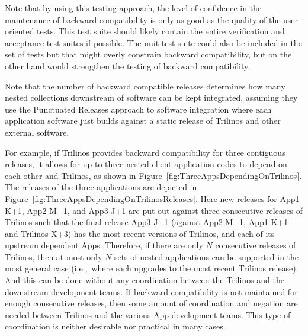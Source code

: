 \documentclass[11pt]{SANDreport}
\begin{document}
Note that by using this testing approach, the level of confidence in
the maintenance of backward compatibility is only as good as the quality
of the user-oriented tests.  This test suite
should likely contain the entire verification and acceptance test
suites if possible.  The unit test suite could also be included in the
set of tests but that might overly constrain backward compatibility,
but on the other hand would strengthen the testing of backward
compatibility.

Note that the number of backward compatible releases determines how
many nested collections downstream of software can be kept integrated,
assuming they use the Punctuated Releases approach to software
integration {}\cite{SoftwareIntegrationforCSE09} where each
application software just builds against a static release of Trilinos
and other external software.

For example, if Trilinos provides backward compatibility for three
contiguous releases, it allows for up to three nested client
application codes to depend on each other and Trilinos, as shown in
Figure~\ref{fig:ThreeAppsDependingOnTrilinos}.  The releases of the
three applications are depicted in
Figure~\ref{fig:ThreeAppsDependingOnTrilinosReleases}.  Here new
releases for App1 K+1, App2 M+1, and App3 J+1 are put out against
three consecutive releases of Trilinos such that the final release
App3 J+1 (against App2 M+1, App1 K+1 and Trilinos X+3) has the most
recent versions of Trilinos, and each of its upstream dependent Apps.
Therefore, if there are only $N$ consecutive releases of Trilinos,
then at most only $N$ sets of nested applications can be supported in
the most general case (i.e.,\ where each upgrades to the most recent
Trilinos release).  And this can be done without any coordination
between the Trilinos and the downstream development teams.  If
backward compatibility is not maintained for enough consecutive
releases, then some amount of coordination and negation are needed
between Trilinos and the various App development teams.  This type
of coordination is neither desirable nor practical in many cases.
\end{document}
